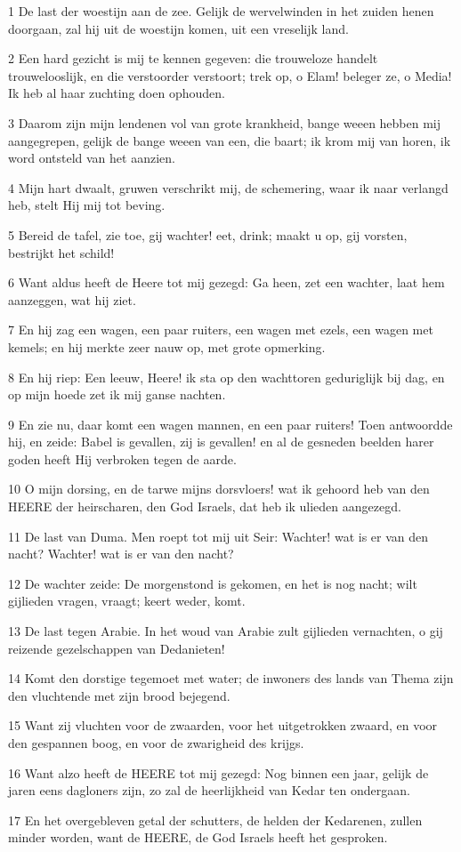 \par 1 De last der woestijn aan de zee. Gelijk de wervelwinden in het zuiden henen doorgaan, zal hij uit de woestijn komen, uit een vreselijk land.
\par 2 Een hard gezicht is mij te kennen gegeven: die trouweloze handelt trouwelooslijk, en die verstoorder verstoort; trek op, o Elam! beleger ze, o Media! Ik heb al haar zuchting doen ophouden.
\par 3 Daarom zijn mijn lendenen vol van grote krankheid, bange weeen hebben mij aangegrepen, gelijk de bange weeen van een, die baart; ik krom mij van horen, ik word ontsteld van het aanzien.
\par 4 Mijn hart dwaalt, gruwen verschrikt mij, de schemering, waar ik naar verlangd heb, stelt Hij mij tot beving.
\par 5 Bereid de tafel, zie toe, gij wachter! eet, drink; maakt u op, gij vorsten, bestrijkt het schild!
\par 6 Want aldus heeft de Heere tot mij gezegd: Ga heen, zet een wachter, laat hem aanzeggen, wat hij ziet.
\par 7 En hij zag een wagen, een paar ruiters, een wagen met ezels, een wagen met kemels; en hij merkte zeer nauw op, met grote opmerking.
\par 8 En hij riep: Een leeuw, Heere! ik sta op den wachttoren geduriglijk bij dag, en op mijn hoede zet ik mij ganse nachten.
\par 9 En zie nu, daar komt een wagen mannen, en een paar ruiters! Toen antwoordde hij, en zeide: Babel is gevallen, zij is gevallen! en al de gesneden beelden harer goden heeft Hij verbroken tegen de aarde.
\par 10 O mijn dorsing, en de tarwe mijns dorsvloers! wat ik gehoord heb van den HEERE der heirscharen, den God Israels, dat heb ik ulieden aangezegd.
\par 11 De last van Duma. Men roept tot mij uit Seir: Wachter! wat is er van den nacht? Wachter! wat is er van den nacht?
\par 12 De wachter zeide: De morgenstond is gekomen, en het is nog nacht; wilt gijlieden vragen, vraagt; keert weder, komt.
\par 13 De last tegen Arabie. In het woud van Arabie zult gijlieden vernachten, o gij reizende gezelschappen van Dedanieten!
\par 14 Komt den dorstige tegemoet met water; de inwoners des lands van Thema zijn den vluchtende met zijn brood bejegend.
\par 15 Want zij vluchten voor de zwaarden, voor het uitgetrokken zwaard, en voor den gespannen boog, en voor de zwarigheid des krijgs.
\par 16 Want alzo heeft de HEERE tot mij gezegd: Nog binnen een jaar, gelijk de jaren eens dagloners zijn, zo zal de heerlijkheid van Kedar ten ondergaan.
\par 17 En het overgebleven getal der schutters, de helden der Kedarenen, zullen minder worden, want de HEERE, de God Israels heeft het gesproken.


